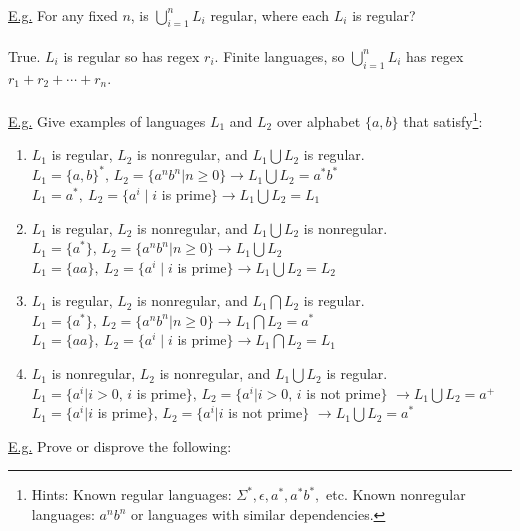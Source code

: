 \documentclass[8pt,letterpaper,twocolumn]{article}
\begin{document}
\\
\underline{E.g.} For any fixed $n$, is $\bigcup_{i=1}^n L_i$ regular, where each $L_i$ is regular?\\
\\
True. $L_i$ is regular so has regex $r_i$.
Finite languages, so $\bigcup_{i=1}^n L_i$ has regex $r_1+r_2+\cdots+r_n$.\\
\\
\underline{E.g.}
Give examples of languages $L_1$ and $L_2$ over alphabet $\{a,b\}$ that satisfy\footnote{Hints:
Known regular languages: $\Sigma^*, \epsilon, a^*, a^* b^*,$ etc.
Known nonregular languages: $a^n b^n$ or languages with similar dependencies.}:
  \begin{enumerate}
  \item $L_1$ is regular, $L_2$ is nonregular, and $L_1 \bigcup L_2$ is regular.\\
  $L_1 = \{a,b\}^*,\, L_2 = \{a^n b^n | n \geq 0\} \rightarrow L_1 \bigcup L_2 = a^* b^*$\\
  $L_1 = a^*,\: L_2 = \{a^i \mid i$ is prime$\} \rightarrow L_1 \bigcup L_2 = L_1$
  
  \item $L_1$ is regular, $L_2$ is nonregular, and $L_1 \bigcup L_2$ is nonregular.\\
  $L_1 = \{a^*\},\, L_2 = \{a^n b^n | n \geq 0\} \rightarrow L_1 \bigcup L_2$\\
  $L_1 = \{aa\},\: L_2 = \{a^i \mid i$ is prime$\} \rightarrow L_1 \bigcup L_2 = L_2$
  
  \item $L_1$ is regular, $L_2$ is nonregular, and $L_1 \bigcap L_2$ is regular.\\
  $L_1 = \{a^*\},\, L_2 = \{a^n b^n | n \geq 0\} \rightarrow L_1 \bigcap L_2 = a^*$\\
  $L_1 = \{aa\},\: L_2 = \{a^i \mid i$ is prime$\} \rightarrow L_1 \bigcap L_2 = L_1$
    
  \item $L_1$ is nonregular, $L_2$ is nonregular, and $L_1 \bigcup L_2$ is regular.\\
  $L_1 = \{a^i | i > 0,\, i$ is prime$\},\, L_2 = \{a^i | i > 0,\, i$ is not prime$\}$
  $\rightarrow L_1 \bigcup L_2 = a^+$\\
  $L_1 = \{a^i | i$ is prime$\},\, L_2 = \{a^i | i$ is not prime$\}$
  $\rightarrow L_1 \bigcup L_2 = a^*$
  \end{enumerate}
\underline{E.g.} Prove or disprove the following:
\end{document}
